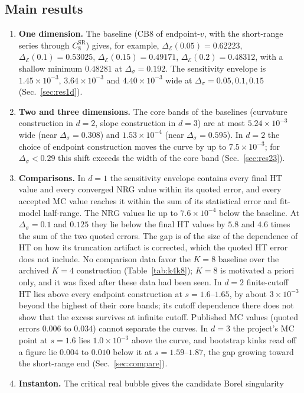 \documentclass[11pt,a4paper]{article}
\numberwithin{equation}{section}
\newcommand{\De}{\Delta_{\mathcal E}}   %
\newcommand{\Ds}{\Delta_\sigma}
\newcommand{\CSR}{C^{\mathrm{SR}}}
\newcommand{\sci}[2]{#1\times10^{#2}}
\begin{document}
\subsection{Main results}
\begin{enumerate}
\item \textbf{One dimension.} The baseline (CB8 of endpoint-$v$, with the short-range
series through $\CSR_8$) gives, for example,
$\De(0.05)=0.62223$, $\De(0.1)=0.53025$, $\De(0.15)=0.49171$, $\De(0.2)=0.48312$,
with a shallow minimum $0.48281$ at $\Ds=0.192$. The sensitivity envelope is
$\sci{1.45}{-3}$, $\sci{3.64}{-3}$ and $\sci{4.40}{-3}$ wide at
$\Ds=0.05,0.1,0.15$ (Sec.~\ref{sec:res1d}).
\item \textbf{Two and three dimensions.} The core bands of the baselines (curvature
construction in $d=2$, slope construction in $d=3$) are at most $\sci{5.24}{-3}$ wide (near
$\Ds=0.308$) and $\sci{1.53}{-4}$ (near $\Ds=0.595$). In $d=2$ the choice of endpoint
construction moves the curve by up to $\sci{7.5}{-3}$; for $\Ds<0.29$ this shift exceeds the
width of the core band (Sec.~\ref{sec:res23}).
\item \textbf{Comparisons.} In $d=1$ the sensitivity envelope contains every final HT value
and every converged NRG value within its quoted error, and every accepted MC value reaches
it within the sum of its statistical error and fit-model half-range. The NRG values lie up
to $\sci{7.6}{-4}$ below the baseline. At $\Ds=0.1$ and $0.125$ they lie below the final HT
values by $5.8$ and $4.6$ times the sum of the two quoted errors. The gap is of the size of
the dependence of HT on how its truncation artifact is corrected, which the quoted HT error
does not include. No comparison data favor the $K=8$ baseline over the archived $K=4$
construction (Table~\ref{tab:k4k8}); $K=8$ is motivated a priori only, and it was fixed after
these data had been seen. In $d=2$ finite-cutoff HT lies above every endpoint construction at
$s=1.6$--$1.65$, by about $\sci{3}{-3}$ beyond the highest of their core bands; its cutoff
dependence there does not show that the excess survives at infinite cutoff. Published MC
values (quoted errors $0.006$ to $0.034$) cannot separate the curves. In $d=3$ the project's
MC point at $s=1.6$ lies $\sci{1.0}{-3}$ above the curve, and bootstrap kinks read off a
figure lie $0.004$ to $0.010$ below it at $s=1.59$--$1.87$, the gap growing toward the
short-range end (Sec.~\ref{sec:compare}).
\item \textbf{Instanton.} The critical real bubble gives the candidate Borel singularity

\end{enumerate}
\end{document}
